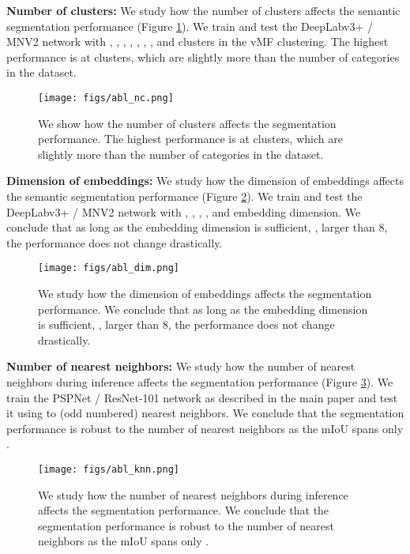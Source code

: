 \documentclass[10pt,twocolumn,letterpaper]{article}
\begin{document}
{\bf Number of clusters:} We study how the number of clusters affects the semantic segmentation performance (Figure \ref{fig:abl_nc}). We train and test the DeepLabv3+ / MNV2 network with , , , , , , , and  clusters in the vMF clustering. The highest performance is at  clusters, which are slightly more than the number of categories in the dataset.


\begin{figure}
    \centering
    \texttt{[image: figs/abl\_nc.png]}
    \caption{We show how the number of clusters affects the segmentation performance. The highest performance is at  clusters, which are slightly more than the number of categories in the dataset.}
    \label{fig:abl_nc}
\end{figure}



{\bf Dimension of embeddings:} We study how the dimension of embeddings affects the semantic segmentation performance (Figure \ref{fig:abl_dim}). We train and test the DeepLabv3+ / MNV2 network with , , , , and  embedding dimension. We conclude that as long as the embedding dimension is sufficient, \ie, larger than 8, the performance does not change drastically.

\begin{figure}
    \centering
    \texttt{[image: figs/abl\_dim.png]}
    \caption{We study how the dimension of embeddings affects the segmentation performance. We conclude that as long as the embedding dimension is sufficient, \ie, larger than 8, the performance does not change drastically.}
    \label{fig:abl_dim}
\end{figure}









{\bf Number of nearest neighbors:} We study how the number of nearest neighbors during inference affects the segmentation performance  (Figure \ref{fig:abl_knn}). We train the PSPNet / ResNet-101 network as described in the main paper and test it using  to  (odd numbered) nearest neighbors. We conclude that the segmentation performance is robust to the number of nearest neighbors as the mIoU spans only .


\begin{figure}
    \centering
    \texttt{[image: figs/abl\_knn.png]}
    \caption{We study how the number of nearest neighbors during inference affects the segmentation performance. We conclude that the segmentation performance is robust to the number of nearest neighbors as the mIoU spans only .}
    \label{fig:abl_knn}
\end{figure}
\end{document}
